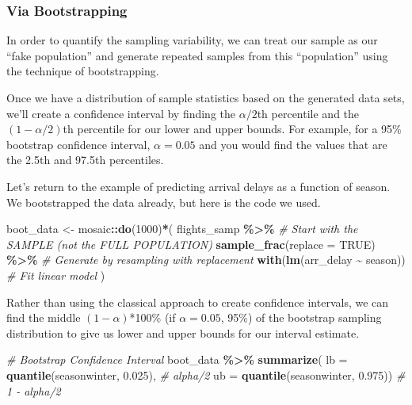 \documentclass[
]{book}
\newenvironment{Shaded}{\begin{snugshade}}{\end{snugshade}}
\newcommand{\AttributeTok}[1]{\textcolor[rgb]{0.13,0.29,0.53}{#1}}
\newcommand{\CommentTok}[1]{\textcolor[rgb]{0.56,0.35,0.01}{\textit{#1}}}
\newcommand{\ConstantTok}[1]{\textcolor[rgb]{0.56,0.35,0.01}{#1}}
\newcommand{\DecValTok}[1]{\textcolor[rgb]{0.00,0.00,0.81}{#1}}
\newcommand{\FloatTok}[1]{\textcolor[rgb]{0.00,0.00,0.81}{#1}}
\newcommand{\FunctionTok}[1]{\textcolor[rgb]{0.13,0.29,0.53}{\textbf{#1}}}
\newcommand{\NormalTok}[1]{#1}
\newcommand{\OtherTok}[1]{\textcolor[rgb]{0.56,0.35,0.01}{#1}}
\newcommand{\SpecialCharTok}[1]{\textcolor[rgb]{0.81,0.36,0.00}{\textbf{#1}}}
\begin{document}
\subsubsection{Via Bootstrapping}\label{via-bootstrapping}

In order to quantify the sampling variability, we can treat our sample as our ``fake population'' and generate repeated samples from this ``population'' using the technique of bootstrapping.

Once we have a distribution of sample statistics based on the generated data sets, we'll create a confidence interval by finding the \(\alpha/2\)th percentile and the \((1-\alpha/2)\)th percentile for our lower and upper bounds. For example, for a 95\% bootstrap confidence interval, \(\alpha = 0.05\) and you would find the values that are the 2.5th and 97.5th percentiles.

Let's return to the example of predicting arrival delays as a function of season. We bootstrapped the data already, but here is the code we used.

\begin{Shaded}
\begin{Highlighting}[]
\NormalTok{boot\_data }\OtherTok{\textless{}{-}}\NormalTok{ mosaic}\SpecialCharTok{::}\FunctionTok{do}\NormalTok{(}\DecValTok{1000}\NormalTok{)}\SpecialCharTok{*}\NormalTok{( }
\NormalTok{    flights\_samp }\SpecialCharTok{\%\textgreater{}\%} \CommentTok{\# Start with the SAMPLE (not the FULL POPULATION)}
      \FunctionTok{sample\_frac}\NormalTok{(}\AttributeTok{replace =} \ConstantTok{TRUE}\NormalTok{) }\SpecialCharTok{\%\textgreater{}\%} \CommentTok{\# Generate by resampling with replacement}
      \FunctionTok{with}\NormalTok{(}\FunctionTok{lm}\NormalTok{(arr\_delay }\SpecialCharTok{\textasciitilde{}}\NormalTok{ season)) }\CommentTok{\# Fit linear model}
\NormalTok{)}
\end{Highlighting}
\end{Shaded}

Rather than using the classical approach to create confidence intervals, we can find the middle \((1-\alpha)\)*100\% (if \(\alpha = 0.05\), 95\%) of the bootstrap sampling distribution to give us lower and upper bounds for our interval estimate.

\begin{Shaded}
\begin{Highlighting}[]
\CommentTok{\# Bootstrap Confidence Interval}
\NormalTok{boot\_data }\SpecialCharTok{\%\textgreater{}\%} 
    \FunctionTok{summarize}\NormalTok{(}
        \AttributeTok{lb =} \FunctionTok{quantile}\NormalTok{(seasonwinter, }\FloatTok{0.025}\NormalTok{), }\CommentTok{\# alpha/2}
        \AttributeTok{ub =} \FunctionTok{quantile}\NormalTok{(seasonwinter, }\FloatTok{0.975}\NormalTok{)) }\CommentTok{\# 1 {-} alpha/2}
\end{Highlighting}
\end{Shaded}
\end{document}
